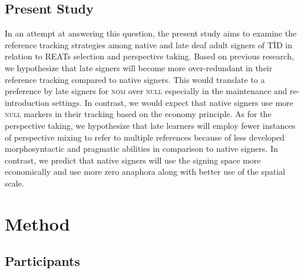 \documentclass[
  english,
  doc,mask]{apa6}
\begin{document}
\hypertarget{present-study}{%
\subsection{Present Study}\label{present-study}}

In an attempt at answering this question, the present study aims to examine the reference tracking strategies among native and late deaf adult signers of TİD in relation to REATs selection and perspective taking. Based on previous research, we hypothesize that late signers will become more over-redundant in their reference tracking compared to native signers. This would translate to a preference by late signers for \textsc{nom} over \textsc{null} especially in the maintenance and re-introduction settings. In contrast, we would expect that native signers use more \textsc{null} markers in their tracking based on the economy principle. As for the perspective taking, we hypothesize that late learners will employ fewer instances of perspective mixing to refer to multiple references because of less developed morphosyntactic and pragmatic abilities in comparison to native signers. In contrast, we predict that native signers will use the signing space more economically and use more zero anaphora along with better use of the spatial scale.

\hypertarget{method}{%
\section{Method}\label{method}}

\hypertarget{participants}{%
\subsection{Participants}\label{participants}}
\end{document}
